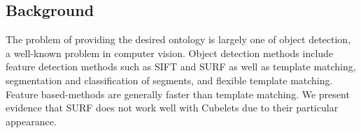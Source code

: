 \documentclass[conference]{IEEEtran}
\begin{document}
\subsection{Background}
The problem of providing the desired ontology is largely one of object detection, a well-known problem in computer vision. Object detection methods include feature detection methods such as SIFT and SURF as well as template matching, segmentation and classification of segments, and flexible template matching. Feature based-methods are generally faster than template matching. We present evidence that SURF does not work well with Cubelets due to their particular appearance.

%
%



%
%
\end{document}
